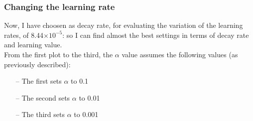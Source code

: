\documentclass{article}
\begin{document}
\subsubsection{Changing the learning rate}

Now, I have choosen as decay rate, for evaluating the variation of the learning rates, of 8.44$\times10^{-5}$: so I can find almost the best settings in terms of decay rate and learning value.
\\
From the first plot to the third, the $\alpha$ value assumes the following values (as previously described):
\begin{itemize}
\item[--] The first sets $\alpha$ to 0.1
\item[--] The second sets $\alpha$ to 0.01
\item[--] The third sets $\alpha$ to 0.001
\end{itemize}

\clearpage


\begin{center}
\centering
{}
\end{center}

\begin{center}
\centering
{}
\end{center}
\end{document}
